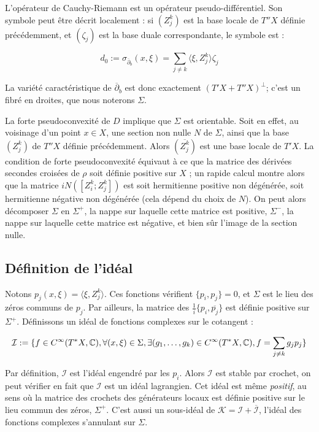 L'opérateur de Cauchy-Riemann est un opérateur pseudo-différentiel. Son symbole peut être décrit localement : si $(Z^k_j)$ est la base locale de $T''X$ définie précédemment, et $(\zeta_j)$ est la base duale correspondante, le symbole est :

\begin{equation*}
	d_0 := \sigma_{\overline{\partial}_b}(x,\xi) = \sum_{j \neq k} \langle \xi, Z^k_j \rangle \zeta_j
\end{equation*}

La variété caractéristique de $\overline{\partial}_b$ est donc exactement $(T'X + T''X)^{\perp}$; c'est un fibré en droites, que nous noterons $\Sigma$. 

La forte pseudoconvexité de $D$ implique que $\Sigma$ est orientable. Soit en effet, au voisinage d'un point $x \in X$, une section non nulle $N$ de $\Sigma$, ainsi que la base $(Z^k_j)$ de $T''X$ définie précédemment. Alors $(\overline{Z^k_j})$ est une base locale de $T'X$. La condition de forte pseudoconvexité équivaut à ce que la matrice des dérivées secondes croisées de $\rho$ soit définie positive sur $X$ ; un rapide calcul montre alors que la matrice $iN([Z^k_i;Z^k_j])$ est soit hermitienne positive non dégénérée, soit hermitienne négative non dégénérée (cela dépend du choix de $N$). On peut alors décomposer $\Sigma$ en $\Sigma^+$, la nappe sur laquelle cette matrice est positive, $\Sigma^-$, la nappe sur laquelle cette matrice est négative, et bien sûr l'image de la section nulle.

\subsection{Définition de l'idéal}

Notons $p_j(x,\xi)= \langle \xi, Z^k_j \rangle$. Ces fonctions vérifient $\{p_i,p_j\}=0$, et $\Sigma$ est le lieu des zéros communs de $p_j$. Par ailleurs, la matrice des $\frac1i \{p_i,\overline{p_j}\}$ est définie positive sur $\Sigma^+$. Définissons un idéal de fonctions complexes sur le cotangent :

\begin{equation*}
	\mathcal{I} := \{f \in C^{\infty}(T^*X, \mathbb{C}), \forall (x,\xi) \in \Sigma, \exists (g_1, \ldots, g_k) \in C^{\infty}(T^*X, \mathbb{C}), f=\sum_{j \neq k}g_jp_j\}
\end{equation*}

Par définition, $\mathcal{I}$ est l'idéal engendré par les $p_i$. Alors $\mathcal{I}$ est stable par crochet, on peut vérifier en fait que $\mathcal{I}$ est un idéal lagrangien. Cet idéal est même \emph{positif}, au sens où la matrice des crochets des générateurs locaux est définie positive sur le lieu commun des zéros, $\Sigma^+$. C'est aussi un sous-idéal de $\mathcal{K}=\mathcal{I} + \overline{\mathcal{I}}$, l'idéal des fonctions complexes s'annulant sur $\Sigma$. 

